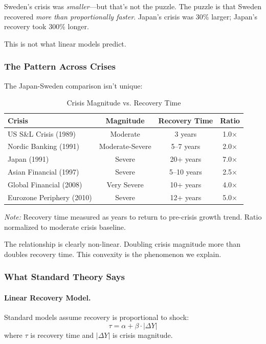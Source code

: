 Sweden's crisis was \emph{smaller}---but that's not the puzzle. The puzzle is 
that Sweden recovered \emph{more than proportionally faster}. Japan's crisis 
was 30\% larger; Japan's recovery took 300\% longer.

This is not what linear models predict.

\subsubsection{The Pattern Across Crises}

The Japan-Sweden comparison isn't unique:

\begin{table}[htbp]
\centering
\caption{Crisis Magnitude vs. Recovery Time}
\label{tab:crisis-recovery}
\small
\begin{tabular}{@{}lccc@{}}
\toprule
\textbf{Crisis} & \textbf{Magnitude} & \textbf{Recovery Time} & \textbf{Ratio} \\
\midrule
US S\&L Crisis (1989) & Moderate & 3 years & 1.0× \\
Nordic Banking (1991) & Moderate-Severe & 5--7 years & 2.0× \\
Japan (1991) & Severe & 20+ years & 7.0× \\
Asian Financial (1997) & Severe & 5--10 years & 2.5× \\
Global Financial (2008) & Very Severe & 10+ years & 4.0× \\
Eurozone Periphery (2010) & Severe & 12+ years & 5.0× \\
\bottomrule
\end{tabular}
\begin{flushleft}
\small\textit{Note:} Recovery time measured as years to return to pre-crisis growth trend. Ratio normalized to moderate crisis baseline.
\end{flushleft}
\end{table}

The relationship is clearly non-linear. Doubling crisis magnitude more than 
doubles recovery time. This convexity is the phenomenon we explain.

\subsubsection{What Standard Theory Says}

\paragraph{Linear Recovery Model.}
Standard models assume recovery is proportional to shock:
\begin{equation}
\tau = \alpha + \beta \cdot |\Delta Y|
\end{equation}
where $\tau$ is recovery time and $|\Delta Y|$ is crisis magnitude.

